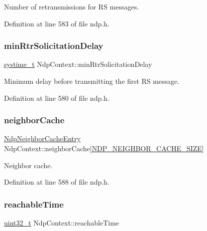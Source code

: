 Number of retransmissions for RS messages. 



Definition at line 583 of file ndp.\+h.

\mbox{\label{structNdpContext_a79e43c50b5147074a654da9c242008d3}} 
\subsubsection{\texorpdfstring{min\+Rtr\+Solicitation\+Delay}{minRtrSolicitationDelay}}
{\footnotesize\ttfamily \hyperlink{compiler__port_8h_ae3e32a98d431a02106616da3071832dd}{systime\+\_\+t} Ndp\+Context\+::min\+Rtr\+Solicitation\+Delay}



Minimum delay before transmitting the first RS message. 



Definition at line 580 of file ndp.\+h.

\mbox{\label{structNdpContext_a161aed0b6e6c3fab541a57acfbb7e229}} 
\subsubsection{\texorpdfstring{neighbor\+Cache}{neighborCache}}
{\footnotesize\ttfamily \hyperlink{structNdpNeighborCacheEntry}{Ndp\+Neighbor\+Cache\+Entry} Ndp\+Context\+::neighbor\+Cache\mbox{[}\hyperlink{net__config_8h_ae64ddc051e0a2cb9f6061cdf4b6bf1a3}{N\+D\+P\+\_\+\+N\+E\+I\+G\+H\+B\+O\+R\+\_\+\+C\+A\+C\+H\+E\+\_\+\+S\+I\+ZE}\mbox{]}}



Neighbor cache. 



Definition at line 588 of file ndp.\+h.

\mbox{\label{structNdpContext_a572ac8209cafbc1f41949fa4031173fc}} 
\subsubsection{\texorpdfstring{reachable\+Time}{reachableTime}}
{\footnotesize\ttfamily \hyperlink{stdint_8h_a435d1572bf3f880d55459d9805097f62}{uint32\+\_\+t} Ndp\+Context\+::reachable\+Time}



